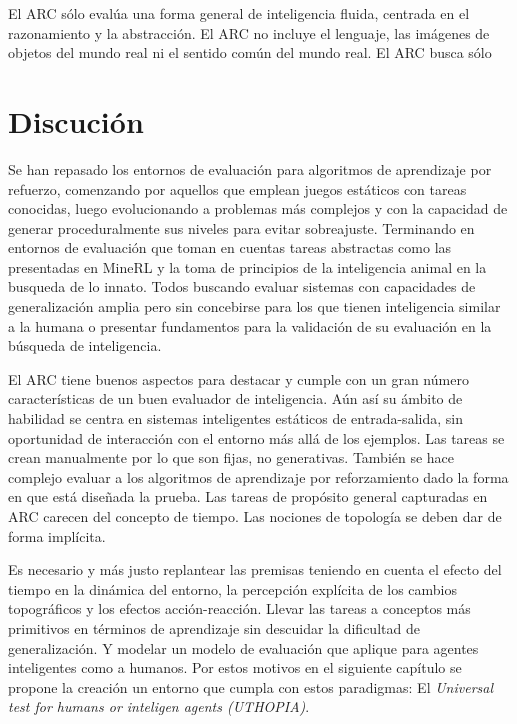El ARC sólo evalúa una forma general de inteligencia fluida, centrada en el razonamiento y la abstracción. El ARC no incluye el lenguaje, las imágenes de objetos del mundo real ni el sentido común del mundo real. El ARC busca sólo

\section{Discución}

Se han repasado los entornos de evaluación para algoritmos de aprendizaje por refuerzo, comenzando por aquellos que emplean juegos estáticos con tareas conocidas, luego evolucionando a problemas más complejos y con la capacidad de generar proceduralmente sus niveles para evitar sobreajuste. Terminando en entornos de evaluación que toman en cuentas tareas abstractas como las presentadas en MineRL y la toma de principios de la inteligencia animal en la busqueda de lo innato. Todos buscando evaluar sistemas con capacidades de generalización amplia pero sin concebirse para los que tienen inteligencia similar a la humana o presentar fundamentos para la validación de su evaluación en la búsqueda de inteligencia.

El ARC tiene buenos aspectos para destacar y cumple con un gran número características de un buen evaluador de inteligencia. Aún así su ámbito de habilidad se centra en sistemas inteligentes estáticos de entrada-salida, sin oportunidad de interacción con el entorno más allá de los ejemplos. Las tareas se crean manualmente por lo que son fijas, no generativas. También se hace complejo evaluar a los algoritmos de aprendizaje por reforzamiento dado la forma en que está diseñada la prueba. Las tareas de propósito general capturadas en ARC carecen del concepto de tiempo. Las nociones de topología se deben dar de forma implícita. 

Es necesario y más justo replantear las premisas teniendo en cuenta el efecto del tiempo en la dinámica del entorno, la percepción explícita de los cambios topográficos y los efectos acción-reacción. Llevar las tareas a conceptos más primitivos en términos de aprendizaje sin descuidar la dificultad de generalización. Y modelar un modelo de evaluación que aplique para agentes inteligentes como a humanos. Por estos motivos en el siguiente capítulo se propone la creación un entorno que cumpla con estos paradigmas: El \textit{Universal test for humans or inteligen agents (UTHOPIA)}.